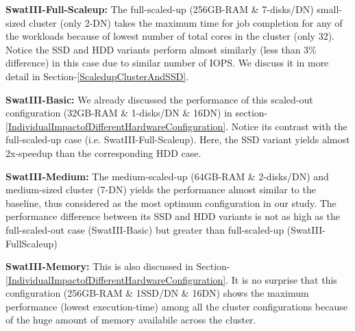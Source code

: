 \documentclass[conference]{IEEEtran}
\begin{document}
\begin{inparaenum}[\itshape 1\upshape)]
\item \textbf{SwatIII-Full-Scaleup:} The full-scaled-up (256GB-RAM \& 7-disks/DN) small-sized cluster (only 2-DN) takes the maximum time for job completion for any of the workloads because of lowest number of total cores in the cluster (only 32). Notice the SSD and HDD variants perform almost similarly (less than 3\% difference) in this case due to similar number of IOPS. We discuss it in more detail in Section-\ref{ScaledupClusterAndSSD}.
\item \textbf{SwatIII-Basic:} We already discussed the performance of this scaled-out configuration (32GB-RAM \& 1-disks/DN \& 16DN) in section-\ref{IndividualImpactofDifferentHardwareConfiguration}. Notice its contrast with the full-scaled-up case (i.e. SwatIII-Full-Scaleup). Here, the SSD variant yields almost 2x-speedup than the corresponding HDD case.  
\item \textbf{SwatIII-Medium:} The medium-scaled-up (64GB-RAM \& 2-disks/DN) and medium-sized cluster (7-DN) yields the performance almost similar to the baseline, thus considered as the most optimum configuration in our study. The performance difference between its SSD and HDD variants is not as high as the full-scaled-out case (SwatIII-Basic) but greater than full-scaled-up (SwatIII-FullScaleup) 
\item \textbf{SwatIII-Memory:} This is also discussed in Section-\ref{IndividualImpactofDifferentHardwareConfiguration}. It is no surprise that this configuration (256GB-RAM \& 1SSD/DN \& 16DN) shows the maximum performance (lowest execution-time) among all the cluster configurations because of the huge amount of memory availabile across the cluster.
\end{inparaenum}
\end{document}
